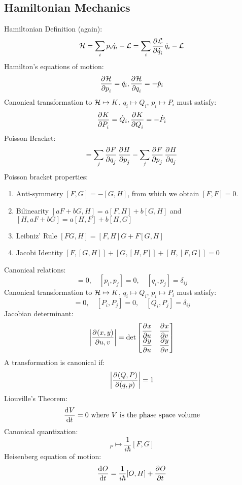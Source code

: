 \documentclass[../PHYS306Notes.tex]{subfiles}
\begin{document}
\subsection{Hamiltonian Mechanics}
Hamiltonian Definition (again):
\begin{equation}
    \HH = \sum_i p_i\dot{q}_i - \LL = \sum_i \dpd{\LL}{\dot{q}_i}\dot{q}_i - \LL
\end{equation}
Hamilton's equations of motion:
\begin{equation}
    \dpd{\HH}{p_i} = \dot{q}_i, \dpd{\HH}{q_i} = -\dot{p}_i
\end{equation}
Canonical transformation to $\mathcal{H} \mapsto K$, $q_i \mapsto Q_i$, $p_i \mapsto P_i$ must satisfy:
\begin{equation}
    \dpd{K}{P_i} = \dot{Q}_i, \dpd{K}{Q_i} = -\dot{P}_i
\end{equation}
Poisson Bracket:
\begin{equation}
    [F, H] = \sum_j \dpd{F}{q_j}\dpd{H}{p_j} - \sum_j \dpd{F}{p_j}\dpd{H}{q_j}
\end{equation}
Poisson bracket properties:
\begin{enumerate}
    \item Anti-symmetry $[F, G] = -[G, H]$, from which we obtain $[F, F] = 0$.
    \item Bilinearity $[aF + bG, H] = a[F, H] + b[G, H]$ and $[H, aF + bG] = a[H, F] + b[H, G]$
    \item Leibniz' Rule $[FG, H] = [F, H]G + F[G, H]$
    \item Jacobi Identity $[F, [G, H]] + [G, [H, F]] + [H, [F, G]] = 0$
\end{enumerate}
Canonical relations:
\begin{equation}
    [q_i, q_j] = 0,\quad [p_i, p_j] = 0, \quad [q_i, p_j] = \delta_{ij}
\end{equation}
Canonical transformation to $\mathcal{H} \mapsto K$, $q_i \mapsto Q_i$, $p_i \mapsto P_i$ must satisfy:
\begin{equation}
    [Q_i, Q_j] = 0,\quad [P_i, P_j] = 0, \quad [Q_i, P_j] = \delta_{ij}
\end{equation}
Jacobian determinant:
\begin{equation}
    \abs{\dpd{(x, y)}{u, v}} = \det \m{\dpd{x}{u} & \dpd{x}{v} \\ \dpd{y}{u} & \dpd{y}{v}}
\end{equation}
A transformation is canonical if:
\begin{equation}
    \abs{\dpd{(Q, P)}{(q, p)}} = 1
\end{equation}
Liouville's Theorem:
\begin{equation}
    \dod{V}{t} = 0 \text{ where $V$ is the phase space volume}
\end{equation}
Canonical quantization:
\begin{equation}
    [F, G]_P \mapsto \frac{1}{i\hbar}[F, G]
\end{equation}
Heisenberg equation of motion:
\begin{equation}
    \dod{O}{t} = \frac{1}{i\hbar}[O, H] + \dpd{O}{t}
\end{equation}
\end{document}
